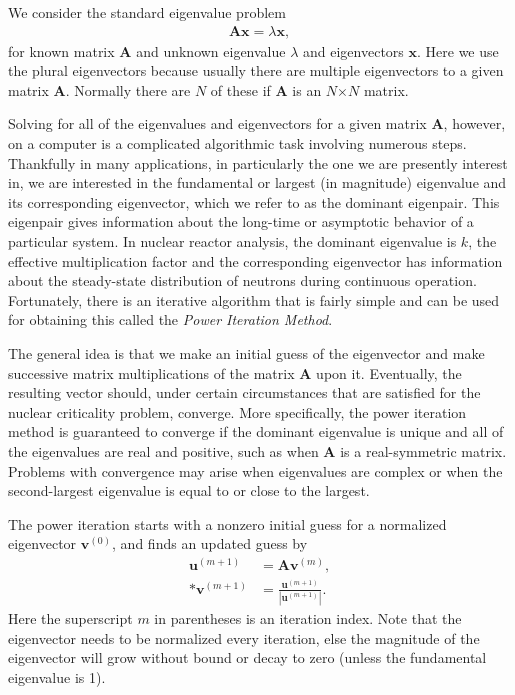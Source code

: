 We consider the standard eigenvalue problem
\begin{align}
  \mathbf{A x} = \lambda \mathbf{x},
\end{align}
for known matrix $\mathbf{A}$ and unknown eigenvalue $\lambda$ and eigenvectors $\mathbf{x}$. Here we use the plural eigenvectors because usually there are multiple eigenvectors to a given matrix $\mathbf{A}$. Normally there are $N$ of these if $\mathbf{A}$ is an $N$$\times$$N$ matrix. 

Solving for all of the eigenvalues and eigenvectors for a given matrix $\mathbf{A}$, however, on a computer is a complicated algorithmic task involving numerous steps. Thankfully in many applications, in particularly the one we are presently interest in, we are interested in the fundamental or largest (in magnitude) eigenvalue and its corresponding eigenvector, which we refer to as the dominant eigenpair. This eigenpair gives information about the long-time or asymptotic behavior of a particular system. In nuclear reactor analysis, the dominant eigenvalue is $k$, the effective multiplication factor and the corresponding eigenvector has information about the steady-state distribution of neutrons during continuous operation. Fortunately, there is an iterative algorithm that is fairly simple and can be used for obtaining this called the \emph{Power Iteration Method}. 

The general idea is that we make an initial guess of the eigenvector and make successive matrix multiplications of the matrix $\mathbf{A}$ upon it. Eventually, the resulting vector should, under certain circumstances that are satisfied for the nuclear criticality problem, converge. More specifically, the power iteration method is guaranteed to converge if the dominant eigenvalue is unique and all of the eigenvalues are real and positive, such as when $\mathbf{A}$ is a real-symmetric matrix. Problems with convergence may arise when eigenvalues are complex or when the second-largest eigenvalue is equal to or close to the largest.

The power iteration starts with a nonzero initial guess for a normalized eigenvector $\mathbf{v}^{(0)}$, and finds an updated guess by
\begin{align}
  \mathbf{u}^{(m+1)} &= \mathbf{A} \mathbf{v}^{(m)} , \\*
  \mathbf{v}^{(m+1)} &= \frac{ \mathbf{u}^{(m+1)} }{ | \mathbf{u}^{(m+1)} | } .
\end{align}
Here the superscript $m$ in parentheses is an iteration index. Note that the eigenvector needs to be normalized every iteration, else the magnitude of the eigenvector will grow without bound or decay to zero (unless the fundamental eigenvalue is 1).

